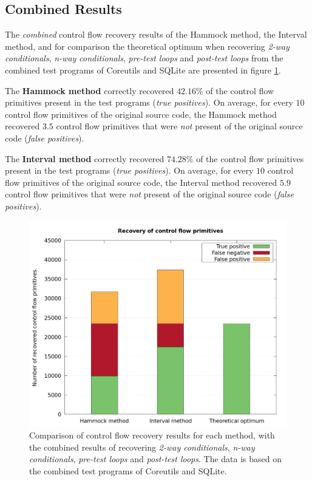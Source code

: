 
\subsection{Combined Results}
\label{sec:combined_results}

The \textit{combined} control flow recovery results of the Hammock method, the Interval method, and for comparison the theoretical optimum when recovering \textit{2-way conditionals}, \textit{n-way conditionals}, \textit{pre-test loops} and \textit{post-test loops} from the combined test programs of Coreutils and SQLite are presented in figure \ref{fig:total_results_combined}.

The \textbf{Hammock method} correctly recovered $42.16\%$ of the control flow primitives present in the test programs (\textit{true positives}). On average, for every $10$ control flow primitives of the original source code, the Hammock method recovered $3.5$ control flow primitives that were \textit{not} present of the original source code (\textit{false positives}).

The \textbf{Interval method} correctly recovered $74.28\%$ of the control flow primitives present in the test programs (\textit{true positives}). On average, for every $10$ control flow primitives of the original source code, the Interval method recovered $5.9$ control flow primitives that were \textit{not} present of the original source code (\textit{false positives}).

\begin{figure}[htbp]
	\centering
	\includegraphics[width=\textwidth]{inc/5_results/results_combined.png}
	\caption{Comparison of control flow recovery results for each method, with the combined results of recovering \textit{2-way conditionals}, \textit{n-way conditionals}, \textit{pre-test loops} and \textit{post-test loops}. The data is based on the combined test programs of Coreutils and SQLite.}
	\label{fig:total_results_combined}
\end{figure}
